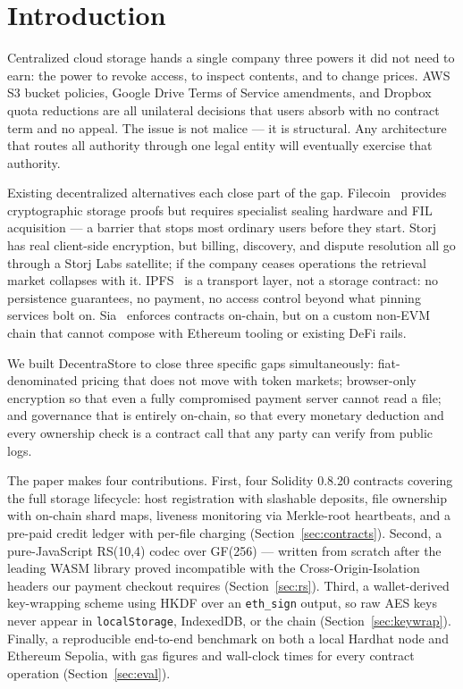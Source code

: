 \documentclass[journal]{IEEEtran}
\begin{document}
\section{Introduction}

Centralized cloud storage hands a single company three powers it did not
need to earn: the power to revoke access, to inspect contents, and to
change prices. AWS S3 bucket policies, Google Drive Terms of Service
amendments, and Dropbox quota reductions are all unilateral decisions
that users absorb with no contract term and no appeal. The issue is not
malice — it is structural. Any architecture that routes all authority
through one legal entity will eventually exercise that authority.

Existing decentralized alternatives each close part of the gap.
Filecoin~\cite{filecoin2020} provides cryptographic storage proofs but
requires specialist sealing hardware and FIL acquisition — a barrier
that stops most ordinary users before they start.
Storj~\cite{storj2018} has real client-side encryption, but billing,
discovery, and dispute resolution all go through a Storj Labs satellite;
if the company ceases operations the retrieval market collapses with it.
IPFS~\cite{ipfs2014} is a transport layer, not a storage contract:
no persistence guarantees, no payment, no access control beyond what
pinning services bolt on.
Sia~\cite{sia2015} enforces contracts on-chain, but on a custom non-EVM
chain that cannot compose with Ethereum tooling or existing DeFi rails.

We built DecentraStore to close three specific gaps simultaneously:
fiat-denominated pricing that does not move with token markets;
browser-only encryption so that even a fully compromised payment server
cannot read a file; and governance that is entirely on-chain, so that
every monetary deduction and every ownership check is a contract call
that any party can verify from public logs.

The paper makes four contributions.
First, four Solidity 0.8.20 contracts covering the full storage lifecycle:
host registration with slashable deposits, file ownership with on-chain
shard maps, liveness monitoring via Merkle-root heartbeats, and a
pre-paid credit ledger with per-file charging (Section~\ref{sec:contracts}).
Second, a pure-JavaScript RS(10,4) codec over GF(256) — written from
scratch after the leading WASM library proved incompatible with the
Cross-Origin-Isolation headers our payment checkout requires
(Section~\ref{sec:rs}).
Third, a wallet-derived key-wrapping scheme using HKDF over an
\texttt{eth\_sign} output, so raw AES keys never appear in
\texttt{localStorage}, IndexedDB, or the chain (Section~\ref{sec:keywrap}).
Finally, a reproducible end-to-end benchmark on both a local Hardhat node
and Ethereum Sepolia, with gas figures and wall-clock times for every
contract operation (Section~\ref{sec:eval}).
\end{document}
